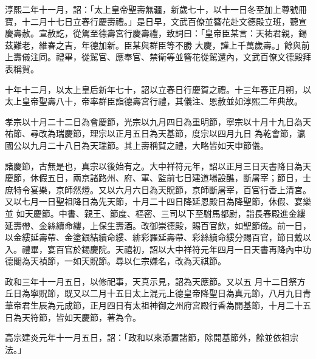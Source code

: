 \begin{pinyinscope}
 淳熙二年十一月，詔：「太上皇帝聖壽無疆，新歲七十，以十一日冬至加上尊號冊寶，十二月十七日立春行慶壽禮。」是日早，文武百僚並簪花赴文德殿立班，聽宣慶壽赦。宣赦訖，從駕至德壽宮行慶壽禮，致詞曰：「皇帝臣某言：天祐君親，錫茲難老，維春之吉，年德加新。臣某與群臣等不勝
 大慶，謹上千萬歲壽。」餘與前上壽儀注同。禮畢，從駕官、應奉官、禁衛等並簪花從駕還內，文武百僚文德殿拜表稱賀。



 十年十二月，以太上皇后新年七十，詔以立春日行慶賀之禮。十三年春正月朔，以太上皇帝聖壽八十，帝率群臣詣德壽宮行禮，其儀注、恩赦並如淳熙二年典故。



 孝宗以十月二十二日為會慶節，光宗以九月四日為重明節，寧宗以十月十九日為天祐節、尋改為瑞慶節，理宗以正月五日為天基節，度宗以四月九日
 為乾會節，瀛國公以九月二十八日為天瑞節。其上壽稱賀之禮，大略皆如天申節儀。



 諸慶節，古無是也，真宗以後始有之。大中祥符元年，詔以正月三日天書降日為天慶節，休假五日，兩京諸路州、府、軍、監前七日建道場設醮，斷屠宰；節日，士庶特令宴樂，京師然燈。又以六月六日為天貺節，京師斷屠宰，百官行香上清宮。又以七月一日聖祖降日為先天節，十月二十四日降延恩殿日為降聖節，休假、宴樂並
 如天慶節。中書、親王、節度、樞密、三司以下至駙馬都尉，詣長春殿進金縷延壽帶、金絲續命縷，上保生壽酒。改御崇德殿，賜百官飲，如聖節儀。前一日，以金縷延壽帶、金塗銀結續命縷、緋彩羅延壽帶、彩絲續命縷分賜百官，節日戴以入。禮畢，宴百官於錫慶院。天禧初，詔以大中祥符元年四月一日天書再降內中功德閣為天禎節，一如天貺節。尋以仁宗嫌名，改為天祺節。



 政和三年十一月五日，以修祀事，天真示見，詔為天應節。又以五
 月十二日祭方丘日為寧貺節，既又以二月十五日太上混元上德皇帝降聖日為真元節，八月九日青華帝君生辰為元成節，正月四日有太祖神御之州府宮殿行香為開基節，十月二十五日為天符節，皆如天慶節，著為令。



 高宗建炎元年十一月五日，詔：「政和以來添置諸節，除開基節外，餘並依祖宗法。」



\end{pinyinscope}